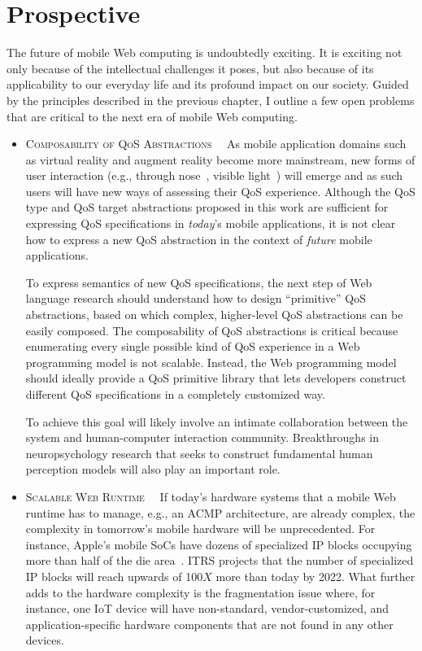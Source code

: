 \section{Prospective}
\label{sec:conc:pros}

The future of mobile Web computing is undoubtedly exciting. It is exciting not only because of the intellectual challenges it poses, but also because of its applicability to our everyday life and its profound impact on our society. Guided by the principles described in the previous chapter, I outline a few open problems that are critical to the next era of mobile Web computing.

\begin{itemize}
  \item \textsc{Composability of QoS Abstractions~~} As mobile application domains such as virtual reality and augment reality become more mainstream, new forms of user interaction (e.g., through nose~\cite{nosewatch}, visible light~\cite{license}) will emerge and as such users will have new ways of assessing their QoS experience. Although the QoS type and QoS target abstractions proposed in this work are sufficient for expressing QoS specifications in \textit{today}'s mobile applications, it is not clear how to express a new QoS abstraction in the context of \textit{future} mobile applications.
  
  To express semantics of new QoS specifications, the next step of Web language research should understand how to design ``primitive'' QoS abstractions, based on which complex, higher-level QoS abstractions can be easily composed. The composability of QoS abstractions is critical because enumerating every single possible kind of QoS experience in a Web programming model is not scalable. Instead, the Web programming model should ideally provide a QoS primitive library that lets developers construct different QoS specifications in a completely customized way.
  
  To achieve this goal will likely involve an intimate collaboration between the system and human-computer interaction community. Breakthroughs in neuropsychology research that seeks to construct fundamental human perception models will also play an important role.
     
  \item \textsc{Scalable Web Runtime~~} If today's hardware systems that a mobile Web runtime has to manage, e.g., an ACMP architecture, are already complex, the complexity in tomorrow's mobile hardware will be unprecedented. For instance, Apple's mobile SoCs have dozens of specialized IP blocks occupying more than half of the die area~\cite{cachehw}. ITRS projects that the number of specialized IP blocks will reach upwards of 100$X$ more than today by 2022. What further adds to the hardware complexity is the fragmentation issue where, for instance, one IoT device will have non-standard, vendor-customized, and application-specific hardware components that are not found in any other devices.
  

\end{itemize}
